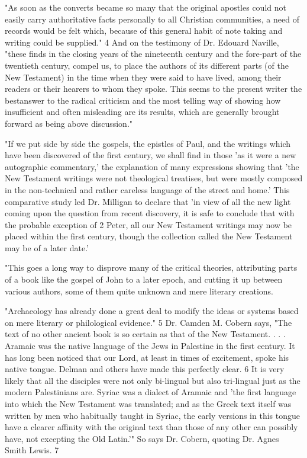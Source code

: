 "As soon as the converts became so many that the original apostles could not easily carry
authoritative facts personally to all Christian communities, a need of records would be felt
which, because of this general habit of note taking and writing could be supplied." 4 And on
the testimony of Dr. Edouard Naville, "these finds in the closing years of the nineteenth
century and the fore-part of the twentieth century, compel us, to place the authors of its
different parts (of the New Testament) in the time when they were said to have lived, among
their readers or their hearers to whom they spoke. This seems to the present writer the bestanswer to the radical criticism and the most telling way of showing how insufficient and
often misleading are its results, which are generally brought forward as being above
discussion."

"If we put side by side the gospels, the epistles of Paul, and the writings which have been
discovered of the first century, we shall find in those 'as it were a new autographic
commentary,' the explanation of many expressions showing that 'the New Testament writings
were not theological treatises, but were mostly composed in the non-technical and rather
careless language of the street and home.' This comparative study led Dr. Milligan to declare
that 'in view of all the new light coming upon the question from recent discovery, it is safe to
conclude that with the probable exception of 2 Peter, all our New Testament writings may
now be placed within the first century, though the collection called the New Testament may
be of a later date.'

"This goes a long way to disprove many of the critical theories, attributing parts of a book
like the gospel of John to a later epoch, and cutting it up between various authors, some of
them quite unknown and mere literary creations.

"Archaeology has already done a great deal to modify the ideas or systems based on mere
literary or philological evidence." 5 Dr. Camden M. Cobern says, "The text of no other
ancient book is so certain as that of the New Testament. . . . Aramaic was the native language
of the Jews in Palestine in the first century. It has long been noticed that our Lord, at least in
times of excitement, spoke his native tongue. Delman and others have made this perfectly
clear. 6 It is very likely that all the disciples were not only bi-lingual but also tri-lingual just
as the modern Palestinians are. Syriac was a dialect of Aramaic and 'the first language into
which the New Testament was translated; and as the Greek text itself was written by men
who habitually taught in Syriac, the early versions in this tongue have a clearer affinity with
the original text than those of any other can possibly have, not excepting the Old Latin.'" So
says Dr. Cobern, quoting Dr. Agnes Smith Lewis. 7

